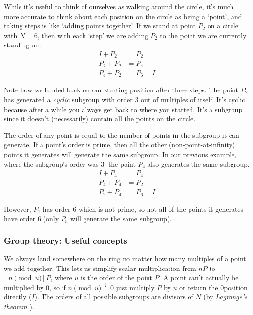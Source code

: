 While it's useful to think of ourselves as walking around the circle, it's much more accurate to think about each position on the circle as being a `point', and taking steps is like `adding points together'. If we stand at point $P_2$ on a circle with $N = 6$, then with each `step' we are adding $P_2$ to the point we are currently standing on.\vspace{.115cm}
\begin{align*}
    I + P_2 &= P_2 \\
    P_2 + P_2 &= P_4 \\
    P_4 + P_2 &= P_6 = I
\end{align*}

Note how we landed back on our starting position after three steps. The point $P_2$ has generated a {\em cyclic} subgroup with order 3 out of multiples of itself. It's cyclic because after a while you always get back to where you started. It's a subgroup since it doesn't (necessarily) contain all the points on the circle.

The order of any point is equal to the number of points in the subgroup it can generate. If a point's order is prime, then all the other (non-point-at-infinity) points it generates will generate the same subgroup. In our previous example, where the subgroup's order was 3, the point $P_4$ also generates the same subgroup.
\begin{align*}
    I + P_4 &= P_4 \\
    P_4 + P_4 &= P_2 \\
    P_2 + P_4 &= P_6 = I
\end{align*}

However, $P_1$ has order 6 which is not prime, so not all of the points it generates have order 6 (only $P_5$ will generate the same subgroup).

\subsubsection{Group theory: Useful concepts}

We always land somewhere on the ring no matter how many multiples of a point we add together. This lets us simplify scalar multiplication from $nP$ to $[n \pmod u] P$, where $u$ is the order of the point $P$. A point can't actually be multiplied by 0, so if $n \pmod u \stackrel{?}{=} 0$ just multiply $P$ by $u$ or return the 0\nth position directly ($I$). The orders of all possible subgroups are divisors of $N$ (by {\em Lagrange’s theorem} \cite{lagranges-theorem}).

